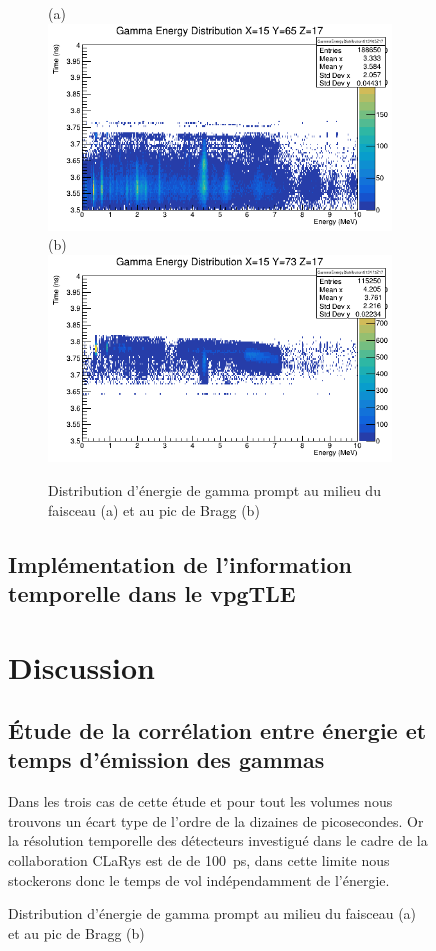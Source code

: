 \documentclass[11pt,a4paper,oldfontcommands]{memoir}
\begin{document}
\begin{figure}
\begin{figure}[h!]
\centering
\subfloat(a){\includegraphics[scale=0.37]{CT/TPS/faisceaugamma.png}}
\subfloat(b){\includegraphics[scale=0.37]{CT/TPS/BraggGamma.png}}
\caption{Distribution d'énergie de gamma prompt au milieu du faisceau (a) et au pic de Bragg (b)}
\label{tps pg}
\end{figure}

\subsection{Implémentation de l'information temporelle dans le vpgTLE}

\section{Discussion}
\subsection{\'Etude de la corrélation entre énergie et temps d'émission des gammas}
Dans les trois cas de cette étude et pour tout les volumes nous trouvons un écart type de l'ordre de la dizaines de picosecondes. Or la résolution temporelle des détecteurs investigué dans le cadre de la collaboration CLaRys est de de 100~ps, dans cette limite nous stockerons donc le temps de vol indépendamment de l'énergie.  


\end{figure}
\end{document}
